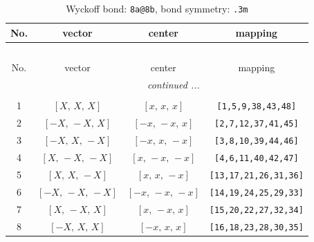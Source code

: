 \documentclass[fleqn,8pt]{jsarticle}
\begin{document}
\begin{longtable}{cccc}
\caption{Wyckoff bond: {\tt 8a@8b}, bond symmetry: {\tt .3m}}
 \\
 \hline \hline
No. & vector & center & mapping \\ \hline \endfirsthead

\multicolumn{3}{l}{\tablename\ \thetable{}} \\
 \hline \hline
No. & vector & center & mapping \\ \hline \endhead

 \hline \hline
\multicolumn{3}{r}{\footnotesize\it continued ...} \\ \endfoot

 \hline \hline
\multicolumn{3}{r}{} \\ \endlastfoot

1 & $\left[ X,\, X,\, X \right]$ & $\left[ x,\, x,\, x \right]$ & {\tt [1,5,9,38,43,48]} \\ \hline
2 & $\left[ - X,\, - X,\, X \right]$ & $\left[ - x,\, - x,\, x \right]$ & {\tt [2,7,12,37,41,45]} \\ \hline
3 & $\left[ - X,\, X,\, - X \right]$ & $\left[ - x,\, x,\, - x \right]$ & {\tt [3,8,10,39,44,46]} \\ \hline
4 & $\left[ X,\, - X,\, - X \right]$ & $\left[ x,\, - x,\, - x \right]$ & {\tt [4,6,11,40,42,47]} \\ \hline
5 & $\left[ X,\, X,\, - X \right]$ & $\left[ x,\, x,\, - x \right]$ & {\tt [13,17,21,26,31,36]} \\ \hline
6 & $\left[ - X,\, - X,\, - X \right]$ & $\left[ - x,\, - x,\, - x \right]$ & {\tt [14,19,24,25,29,33]} \\ \hline
7 & $\left[ X,\, - X,\, X \right]$ & $\left[ x,\, - x,\, x \right]$ & {\tt [15,20,22,27,32,34]} \\ \hline
8 & $\left[ - X,\, X,\, X \right]$ & $\left[ - x,\, x,\, x \right]$ & {\tt [16,18,23,28,30,35]} \\
\end{longtable}
\renewcommand{\arraystretch}{1.2}
\end{document}
